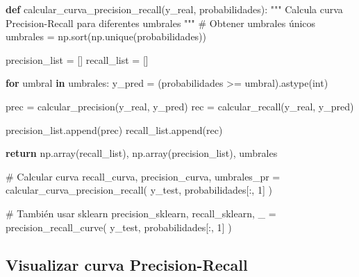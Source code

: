 \documentclass[
  doc,
  floatsintext,
  longtable,
  a4paper,
  nolmodern,
  notxfonts,
  notimes,
  12pt,
  colorlinks=true,linkcolor=blue,citecolor=blue,urlcolor=blue]{apa7}
\newenvironment{Shaded}{\begin{snugshade}}{\end{snugshade}}
\newcommand{\BuiltInTok}[1]{\textcolor[rgb]{0.00,0.23,0.31}{#1}}
\newcommand{\CommentTok}[1]{\textcolor[rgb]{0.37,0.37,0.37}{#1}}
\newcommand{\ControlFlowTok}[1]{\textcolor[rgb]{0.00,0.23,0.31}{\textbf{#1}}}
\newcommand{\DecValTok}[1]{\textcolor[rgb]{0.68,0.00,0.00}{#1}}
\newcommand{\KeywordTok}[1]{\textcolor[rgb]{0.00,0.23,0.31}{\textbf{#1}}}
\newcommand{\NormalTok}[1]{\textcolor[rgb]{0.00,0.23,0.31}{#1}}
\newcommand{\OperatorTok}[1]{\textcolor[rgb]{0.37,0.37,0.37}{#1}}
\begin{document}
\begin{Shaded}
\begin{Highlighting}[]
\KeywordTok{def}\NormalTok{ calcular\_curva\_precision\_recall(y\_real, probabilidades):}
    \CommentTok{"""}
\CommentTok{    Calcula curva Precision{-}Recall para diferentes umbrales}
\CommentTok{    """}
    \CommentTok{\# Obtener umbrales únicos}
\NormalTok{    umbrales }\OperatorTok{=}\NormalTok{ np.sort(np.unique(probabilidades))}
    
\NormalTok{    precision\_list }\OperatorTok{=}\NormalTok{ []}
\NormalTok{    recall\_list }\OperatorTok{=}\NormalTok{ []}
    
    \ControlFlowTok{for}\NormalTok{ umbral }\KeywordTok{in}\NormalTok{ umbrales:}
\NormalTok{        y\_pred }\OperatorTok{=}\NormalTok{ (probabilidades }\OperatorTok{\textgreater{}=}\NormalTok{ umbral).astype(}\BuiltInTok{int}\NormalTok{)}
        
\NormalTok{        prec }\OperatorTok{=}\NormalTok{ calcular\_precision(y\_real, y\_pred)}
\NormalTok{        rec }\OperatorTok{=}\NormalTok{ calcular\_recall(y\_real, y\_pred)}
        
\NormalTok{        precision\_list.append(prec)}
\NormalTok{        recall\_list.append(rec)}
    
    \ControlFlowTok{return}\NormalTok{ np.array(recall\_list), np.array(precision\_list), umbrales}

\CommentTok{\# Calcular curva}
\NormalTok{recall\_curva, precision\_curva, umbrales\_pr }\OperatorTok{=}\NormalTok{ calcular\_curva\_precision\_recall(}
\NormalTok{    y\_test, probabilidades[:, }\DecValTok{1}\NormalTok{]}
\NormalTok{)}

\CommentTok{\# También usar sklearn}
\NormalTok{precision\_sklearn, recall\_sklearn, \_ }\OperatorTok{=}\NormalTok{ precision\_recall\_curve(}
\NormalTok{    y\_test, probabilidades[:, }\DecValTok{1}\NormalTok{]}
\NormalTok{)}
\end{Highlighting}
\end{Shaded}

\subsection{Visualizar curva
Precision-Recall}\label{visualizar-curva-precision-recall}
\end{document}
